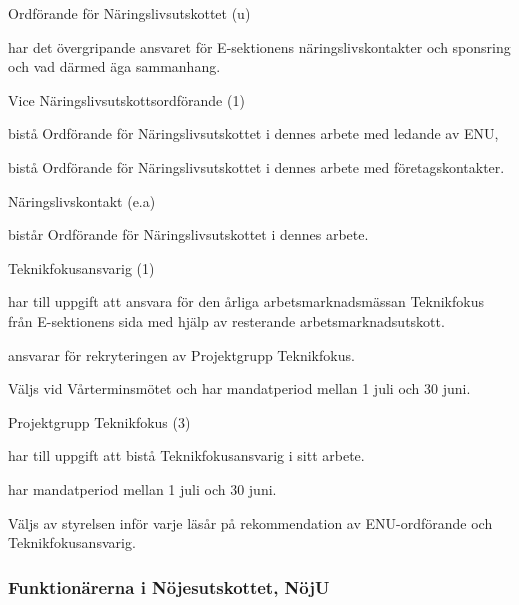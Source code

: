 \documentclass[10pt]{article}
\begin{document}
\begin{emptylist}
    \item Ordförande för Näringslivsutskottet (u)
        \begin{dashlist}
            \item har det övergripande ansvaret för E-sektionens
                näringslivskontakter och sponsring och vad därmed äga
                sammanhang.
        \end{dashlist}
    \item Vice Näringslivsutskottsordförande (1)
        \begin{dashlist}
            \item bistå Ordförande för Näringslivsutskottet i dennes arbete med ledande av ENU,
            \item bistå Ordförande för Näringslivsutskottet i dennes arbete med företagskontakter.
        \end{dashlist}
    \item Näringslivskontakt (e.a)
        \begin{dashlist}
            \item bistår Ordförande för Näringslivsutskottet i dennes arbete.
        \end{dashlist}
    \item Teknikfokusansvarig (1)
    		\begin{dashlist}
    			\item har till uppgift att ansvara för den årliga arbetsmarknadsmässan Teknikfokus från E-sektionens sida med hjälp av resterande arbetsmarknadsutskott.
    			\item ansvarar för rekryteringen av Projektgrupp Teknikfokus.
                \item Väljs vid Vårterminsmötet och har mandatperiod mellan 1 juli och 30 juni.
    		\end{dashlist}
    	\item Projektgrupp Teknikfokus (3)
    		\begin{dashlist}
    			\item har till uppgift att bistå Teknikfokusansvarig i sitt arbete.
    			\item har mandatperiod mellan 1 juli och 30 juni.
    			\item Väljs av styrelsen inför varje läsår på rekommendation av ENU-ordförande och Teknikfokusansvarig.
    		\end{dashlist}
\end{emptylist}

\subsubsection{Funktionärerna i Nöjesutskottet, NöjU}
\end{document}
